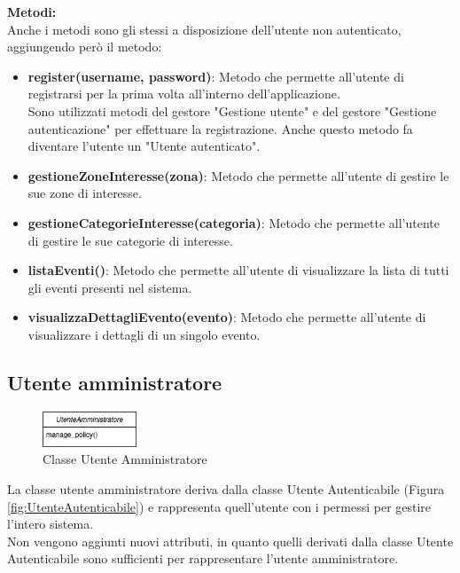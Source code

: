 \textbf{Metodi:}\\
Anche i metodi sono gli stessi a disposizione dell'utente non autenticato, aggiungendo però il metodo:
\begin{itemize}
    \item \textbf{register(username, password)}: Metodo che permette all'utente di registrarsi per la prima volta all'interno dell'applicazione.\\Sono utilizzati metodi del gestore "Gestione utente" e del gestore "Gestione autenticazione" per effettuare la registrazione. Anche questo metodo fa diventare l'utente un "Utente autenticato".
    \item \textbf{gestioneZoneInteresse(zona)}: Metodo che permette all'utente di gestire le sue zone di interesse.
    \item \textbf{gestioneCategorieInteresse(categoria)}: Metodo che permette all'utente di gestire le sue categorie di interesse.
    \item \textbf{listaEventi()}: Metodo che permette all'utente di visualizzare la lista di tutti gli eventi presenti nel sistema.
    \item \textbf{visualizzaDettagliEvento(evento)}: Metodo che permette all'utente di visualizzare i dettagli di un singolo evento.
\end{itemize}

\clearpage

\subsection{Utente amministratore}

\begin{figure}[htbp]
    \centering
    \includegraphics[width=0.25\textwidth]{Images/UtenteAmministratore-Class.png}
    \caption{Classe Utente Amministratore}
    \label{fig:utente_amministratore}
\end{figure}

La classe utente amministratore deriva dalla classe Utente Autenticabile (Figura \ref{fig:UtenteAutenticabile}) e rappresenta quell'utente con i permessi per gestire l'intero sistema.\\

Non vengono aggiunti nuovi attributi, in quanto quelli derivati dalla classe Utente Autenticabile sono sufficienti per rappresentare l'utente amministratore.\\

